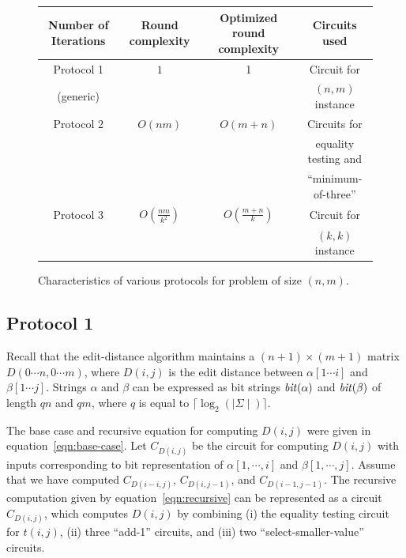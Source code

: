 \begin{figure}
\begin{center}
\begin{tabular}{|c|c|c|c|} \hline
 {\sf\small Number of Iterations} & {\sf\small Round complexity} & 
{\sf\small Optimized round complexity} & {\sf\small  Circuits used} \\ \hline
Protocol 1 & $1$ & 1 & Circuit for \\ 
(generic)  & & & $(n,m)$ instance \\ \hline
Protocol 2 & $O(nm)$  & $O(m+n)$ & Circuits for \\
	   & & & equality testing and \\
           & & & ``minimum-of-three'' \\ \hline
Protocol 3 & $O(\frac{nm}{k^2})$  & $O(\frac{m+n}{k})$ & Circuit for \\ 
           & & &  $(k,k)$ instance \\ \hline
\end{tabular}
\end{center}
\caption{Characteristics of various protocols for problem of size $(n,m)$.}
\label{fig:protocol-characteristics}
\end{figure}

\subsection{Protocol 1}

Recall that the edit-distance algorithm maintains a $(n+1) \times
(m+1)$ matrix $D(0 \cdots n, 0 \cdots m)$, where $D(i,j)$ is the
edit distance between $\alpha [1 \cdots i]$ and $\beta [1 \cdots j]$.
Strings $\alpha$ and $\beta$ can be expressed as bit strings ${\it
bit}(\alpha)$ and ${\it bit}(\beta)$ of length $qn$ and $qm$, where $q$
is equal to $\lceil \log_2 (\mid \Sigma \mid) \rceil$.

The base case and recursive equation for computing $D(i,j)$ were given
in equation~\ref{eqn:base-case}. Let $C_{D(i,j)}$ be the circuit for
computing $D(i,j)$ with inputs corresponding to bit representation of
$\alpha [1,\cdots,i]$ and $\beta [1,\cdots,j]$. Assume that we have
computed $C_{D(i-i,j)}$, $C_{D(i,j-1)}$, and $C_{D(i-1,j-1)}$. The
recursive computation given by equation~\ref{eqn:recursive} can be
represented as a circuit $C_{D(i,j)}$, which computes $D(i,j)$ by
combining (i) the equality testing circuit for $t(i,j)$, (ii) three
``add-1'' circuits, and (iii) two ``select-smaller-value'' circuits.

